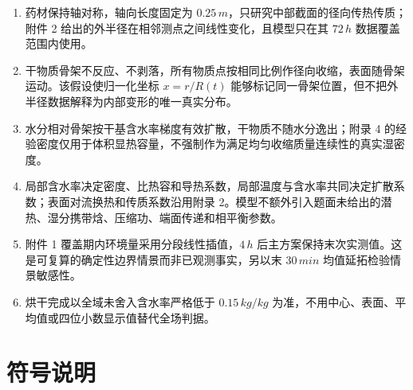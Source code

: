 \documentclass[withoutpreface,bwprint]{cumcmthesis}
\begin{document}
\begin{enumerate}
  \item 药材保持轴对称，轴向长度固定为 $0.25\,\si{m}$，只研究中部截面的径向传热传质；附件 2 给出的外半径在相邻测点之间线性变化，且模型只在其 $72\,\si{h}$ 数据覆盖范围内使用。
  \item 干物质骨架不反应、不剥落，所有物质点按相同比例作径向收缩，表面随骨架运动。该假设使归一化坐标 $x=r/R(t)$ 能够标记同一骨架位置，但不把外半径数据解释为内部变形的唯一真实分布。
  \item 水分相对骨架按干基含水率梯度有效扩散，干物质不随水分逸出；附录 4 的经验密度仅用于体积显热容量，不强制作为满足均匀收缩质量连续性的真实湿密度。
  \item 局部含水率决定密度、比热容和导热系数，局部温度与含水率共同决定扩散系数；表面对流换热和传质系数沿用附录 2。模型不额外引入题面未给出的潜热、湿分携带焓、压缩功、端面传递和相平衡参数。
  \item 附件 1 覆盖期内环境量采用分段线性插值，$4\,\si{h}$ 后主方案保持末次实测值。这是可复算的确定性边界情景而非已观测事实，另以末 $30\,\si{min}$ 均值延拓检验情景敏感性。
  \item 烘干完成以全域未舍入含水率严格低于 $0.15\,\si{kg/kg}$ 为准，不用中心、表面、平均值或四位小数显示值替代全场判据。
\end{enumerate}

\section{符号说明}
\end{document}
